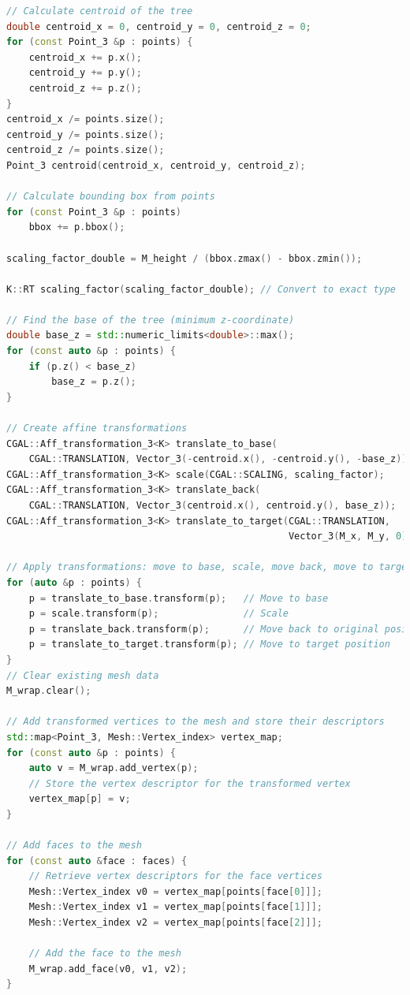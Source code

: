 \documentclass[12pt]{article}
\begin{document}
\begin{lstlisting}[language=C++]
// Calculate centroid of the tree
double centroid_x = 0, centroid_y = 0, centroid_z = 0;
for (const Point_3 &p : points) {
    centroid_x += p.x();
    centroid_y += p.y();
    centroid_z += p.z();
}
centroid_x /= points.size();
centroid_y /= points.size();
centroid_z /= points.size();
Point_3 centroid(centroid_x, centroid_y, centroid_z);

// Calculate bounding box from points
for (const Point_3 &p : points)
    bbox += p.bbox();

scaling_factor_double = M_height / (bbox.zmax() - bbox.zmin());

K::RT scaling_factor(scaling_factor_double); // Convert to exact type

// Find the base of the tree (minimum z-coordinate)
double base_z = std::numeric_limits<double>::max();
for (const auto &p : points) {
    if (p.z() < base_z)
        base_z = p.z();
}

// Create affine transformations
CGAL::Aff_transformation_3<K> translate_to_base(
    CGAL::TRANSLATION, Vector_3(-centroid.x(), -centroid.y(), -base_z));
CGAL::Aff_transformation_3<K> scale(CGAL::SCALING, scaling_factor);
CGAL::Aff_transformation_3<K> translate_back(
    CGAL::TRANSLATION, Vector_3(centroid.x(), centroid.y(), base_z));
CGAL::Aff_transformation_3<K> translate_to_target(CGAL::TRANSLATION,
                                                  Vector_3(M_x, M_y, 0));

// Apply transformations: move to base, scale, move back, move to target
for (auto &p : points) {
    p = translate_to_base.transform(p);   // Move to base
    p = scale.transform(p);               // Scale
    p = translate_back.transform(p);      // Move back to original position
    p = translate_to_target.transform(p); // Move to target position
}
// Clear existing mesh data
M_wrap.clear();

// Add transformed vertices to the mesh and store their descriptors
std::map<Point_3, Mesh::Vertex_index> vertex_map;
for (const auto &p : points) {
    auto v = M_wrap.add_vertex(p);
    // Store the vertex descriptor for the transformed vertex
    vertex_map[p] = v;
}

// Add faces to the mesh
for (const auto &face : faces) {
    // Retrieve vertex descriptors for the face vertices
    Mesh::Vertex_index v0 = vertex_map[points[face[0]]];
    Mesh::Vertex_index v1 = vertex_map[points[face[1]]];
    Mesh::Vertex_index v2 = vertex_map[points[face[2]]];

    // Add the face to the mesh
    M_wrap.add_face(v0, v1, v2);
}
\end{lstlisting}
\end{document}
